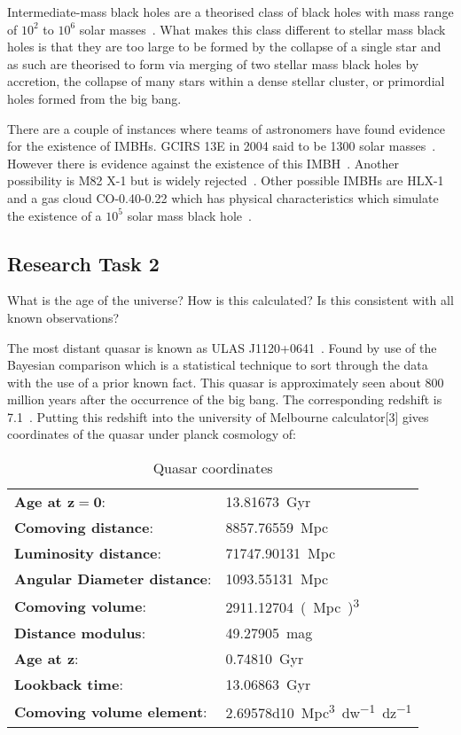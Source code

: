 \documentclass[a4paper]{article} %
\begin{document}
Intermediate-mass black holes are a theorised class of black holes with mass range of $10^2$ to $10^6$ solar masses~\cite{ColeMiller}. What makes this class different to stellar mass black holes is that they are too large to be formed by the collapse of a single star and as such are theorised to form via merging of two stellar mass black holes by accretion, the collapse of many stars within a dense stellar cluster, or primordial holes formed from the big bang.

There are a couple of instances where teams of astronomers have found evidence for the existence of IMBHs. GCIRS 13E in 2004 said to be 1300 solar masses~\cite{S2}. However there is evidence against the existence of this IMBH~\cite{Schodel:2005qm}. Another possibility is M82 X-1 but is widely rejected~\cite{DyingStar}. Other possible IMBHs are HLX-1~\cite{AstronomersSpot} and a gas cloud CO-0.40-0.22 which has physical characteristics which simulate the existence of a $10^5$ solar mass black hole~\cite{IMBHsig}.


\subsection{Research Task 2}
\begin{framed}
What is the age of the universe? How is this calculated? Is this consistent with all known observations?
\end{framed}

The most distant quasar is known as ULAS J1120+0641~\cite{QuasarHunting}. Found by use of the Bayesian comparison which is a statistical technique to sort through the data with the use of a prior known fact. This quasar is approximately seen about 800 million years after the occurrence of the big bang. The corresponding redshift is 7.1~\cite{DistantQuasar}.
Putting this redshift into the university of Melbourne calculator[3] gives coordinates of the quasar under planck cosmology of:


\begin{table}[h]
\centering
\begin{tabular}{ll}
\textbf{Age at $\bm{z=0}$}:&\SI{13.81673}{Gyr}\\
\textbf{Comoving distance}:&\SI{8857.76559}{Mpc}\\
\textbf{Luminosity distance}:&\SI{71747.90131}{Mpc}\\
\textbf{Angular Diameter distance}:&\SI{1093.55131}{Mpc}\\
\textbf{Comoving volume}:&\SI{2911.12704}{(Mpc)^3}\\
\textbf{Distance modulus}:&\SI{49.27905}{mag}\\
\textbf{Age at $\bm{z}$}:&\SI{0.74810}{Gyr}\\
\textbf{Lookback time}:&\SI{13.06863}{Gyr}\\
\textbf{Comoving volume element}:&\SI{2.69578d10}{Mpc^3 dw^{-1} dz^{-1}}	
\end{tabular}
\caption{Quasar coordinates}
\end{table}
\end{document}
